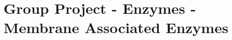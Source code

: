 \chapter{Group Project - Enzymes - Membrane Associated Enzymes}
\setlength{\headheight}{12.71342pt}
\addtolength{\topmargin}{-0.71342pt}

